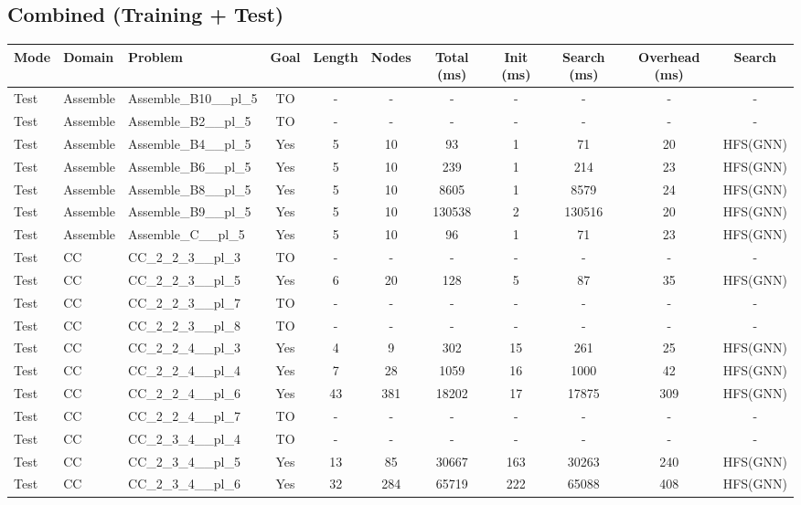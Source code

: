 \documentclass{article}
\begin{document}
\subsection*{Combined (Training + Test)}
\begin{tabular}{lllcccccccc}
\toprule
Mode & Domain & Problem & Goal & Length & Nodes & Total (ms) & Init (ms) & Search (ms) & Overhead (ms) & Search \\
\midrule
Test & Assemble & Assemble\_B10\_\_pl\_5 & TO & - & - & - & - & - & - & - \\
Test & Assemble & Assemble\_B2\_\_pl\_5 & TO & - & - & - & - & - & - & - \\
Test & Assemble & Assemble\_B4\_\_pl\_5 & Yes & 5 & 10 & 93 & 1 & 71 & 20 & HFS(GNN) \\
Test & Assemble & Assemble\_B6\_\_pl\_5 & Yes & 5 & 10 & 239 & 1 & 214 & 23 & HFS(GNN) \\
Test & Assemble & Assemble\_B8\_\_pl\_5 & Yes & 5 & 10 & 8605 & 1 & 8579 & 24 & HFS(GNN) \\
Test & Assemble & Assemble\_B9\_\_pl\_5 & Yes & 5 & 10 & 130538 & 2 & 130516 & 20 & HFS(GNN) \\
Test & Assemble & Assemble\_C\_\_pl\_5 & Yes & 5 & 10 & 96 & 1 & 71 & 23 & HFS(GNN) \\
Test & CC & CC\_2\_2\_3\_\_pl\_3 & TO & - & - & - & - & - & - & - \\
Test & CC & CC\_2\_2\_3\_\_pl\_5 & Yes & 6 & 20 & 128 & 5 & 87 & 35 & HFS(GNN) \\
Test & CC & CC\_2\_2\_3\_\_pl\_7 & TO & - & - & - & - & - & - & - \\
Test & CC & CC\_2\_2\_3\_\_pl\_8 & TO & - & - & - & - & - & - & - \\
Test & CC & CC\_2\_2\_4\_\_pl\_3 & Yes & 4 & 9 & 302 & 15 & 261 & 25 & HFS(GNN) \\
Test & CC & CC\_2\_2\_4\_\_pl\_4 & Yes & 7 & 28 & 1059 & 16 & 1000 & 42 & HFS(GNN) \\
Test & CC & CC\_2\_2\_4\_\_pl\_6 & Yes & 43 & 381 & 18202 & 17 & 17875 & 309 & HFS(GNN) \\
Test & CC & CC\_2\_2\_4\_\_pl\_7 & TO & - & - & - & - & - & - & - \\
Test & CC & CC\_2\_3\_4\_\_pl\_4 & TO & - & - & - & - & - & - & - \\
Test & CC & CC\_2\_3\_4\_\_pl\_5 & Yes & 13 & 85 & 30667 & 163 & 30263 & 240 & HFS(GNN) \\
Test & CC & CC\_2\_3\_4\_\_pl\_6 & Yes & 32 & 284 & 65719 & 222 & 65088 & 408 & HFS(GNN) \\

\end{tabular}
\end{document}
